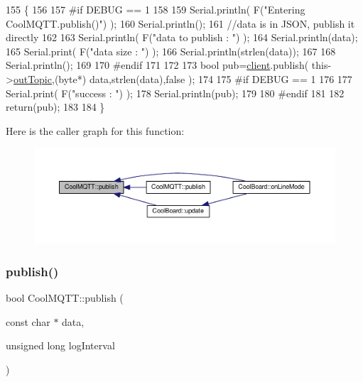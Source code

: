 \begin{DoxyCode}
155 \{
156 
157 \textcolor{preprocessor}{#if DEBUG == 1 }
158 
159     Serial.println( F(\textcolor{stringliteral}{"Entering CoolMQTT.publish()"}) );
160     Serial.println();
161     \textcolor{comment}{//data is in JSON, publish it directly}
162 
163     Serial.println( F(\textcolor{stringliteral}{"data to publish : "}) );
164     Serial.println(data);
165     Serial.print( F(\textcolor{stringliteral}{"data size : "}) );
166     Serial.println(strlen(data));
167 
168     Serial.println();
169 
170 \textcolor{preprocessor}{#endif}
171     
172 
173     \textcolor{keywordtype}{bool} pub=\hyperlink{classCoolMQTT_a4ca71e4f76ef868692a297efd45b1415}{client}.publish( this->\hyperlink{classCoolMQTT_a109c786a17b463f9eeba046194279522}{outTopic},(byte*) data,strlen(data),\textcolor{keyword}{false}  );
174 
175 \textcolor{preprocessor}{#if DEBUG == 1 }
176 
177     Serial.print( F(\textcolor{stringliteral}{"success : "}) );
178     Serial.println(pub);    
179 
180 \textcolor{preprocessor}{#endif}
181 
182     \textcolor{keywordflow}{return}(pub);
183 
184 \}
\end{DoxyCode}
Here is the caller graph for this function\+:
\nopagebreak
\begin{figure}[H]
\begin{center}
\leavevmode
\includegraphics[width=350pt]{classCoolMQTT_ace977b3e90ab14b1199fe5c4fb0a13ec_icgraph}
\end{center}
\end{figure}
\mbox{\label{classCoolMQTT_a613c5e3927ae85bb94fbf648d84d8780}} 
\subsubsection{\texorpdfstring{publish()}{publish()}\hspace{0.1cm}{\footnotesize\ttfamily [2/2]}}
{\footnotesize\ttfamily bool Cool\+M\+Q\+T\+T\+::publish (\begin{DoxyParamCaption}\item[{const char $\ast$}]{data,  }\item[{unsigned long}]{log\+Interval }\end{DoxyParamCaption})}

